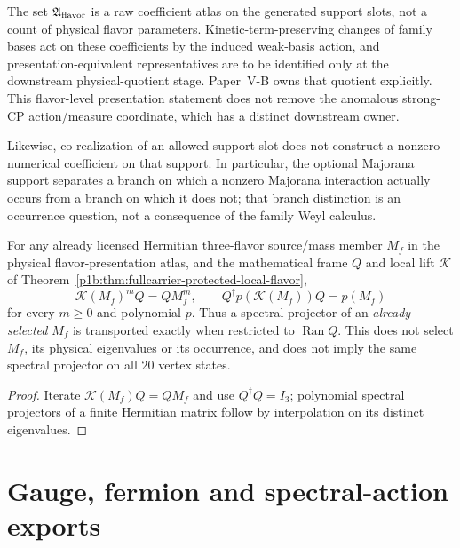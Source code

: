 \documentclass[12pt,a4paper]{article}
\begin{document}
\begin{remark}
\label{p5:rem:flavor-presentation-occurrence-firewall}
The set \(\mathfrak A_{\rm flavor}\) is a raw coefficient atlas on the
generated support slots, not a count of physical flavor parameters.
Kinetic-term-preserving changes of family bases act on these coefficients by
the induced weak-basis action, and presentation-equivalent representatives
are to be identified only at the downstream physical-quotient stage.
Paper~V-B owns that quotient explicitly.  This flavor-level presentation
statement does not remove the anomalous strong-CP action/measure coordinate,
which has a distinct downstream owner.

Likewise, co-realization of an allowed support slot does not construct a
nonzero numerical coefficient on that support.  In particular, the optional
Majorana support separates a branch on which a nonzero Majorana interaction
actually occurs from a branch on which it does not; that branch distinction is
an occurrence question, not a consequence of the family Weyl calculus.
\end{remark}


\begin{corollary}
\label{p5:cor:fullcarrier-flavor-mass-transport}
For any already licensed Hermitian three-flavor source/mass member
$M_f$ in the physical flavor-presentation atlas, and the mathematical
frame $Q$ and local lift $\mathscr K$ of
Theorem~\ref{p1b:thm:fullcarrier-protected-local-flavor},
\[
 \boxed{\mathscr K(M_f)^mQ=QM_f^m,\qquad
 Q^\dagger p(\mathscr K(M_f))Q=p(M_f)}
\]
for every $m\ge0$ and polynomial $p$.  Thus a spectral projector of
an \emph{already selected} $M_f$ is transported exactly when restricted
to $\operatorname{Ran}Q$.  This does not select $M_f$, its physical
eigenvalues or its occurrence, and does not imply the same spectral
projector on all $20$ vertex states.
\end{corollary}
\begin{proof}
Iterate $\mathscr K(M_f)Q=QM_f$ and use $Q^\dagger Q=I_3$;
polynomial spectral projectors of a finite Hermitian matrix follow by
interpolation on its distinct eigenvalues.
\end{proof}


\section{Gauge, fermion and spectral-action exports}
\label{p5a:sec:organized-exports}
\end{document}
